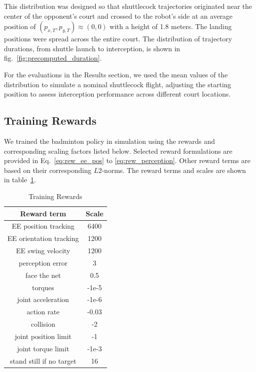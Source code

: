 \documentclass[9pt,twocolumn,twoside]{osajnl}
\begin{document}
This distribution was designed so that shuttlecock trajectories originated near the center of the opponent's court and crossed to the robot's side at an average position of $(p_{x,T}, p_{y,T}) \approx (0, 0)$ with a height of 1.8 meters. The landing positions were spread across the entire court. The distribution of trajectory durations, from shuttle launch to interception, is shown in fig.~\ref{fig:precomputed_duration}.



For the evaluations in the Results section, we used the mean values of the distribution to simulate a nominal shuttlecock flight, adjusting the starting position to assess interception performance across different court locations.


\subsection*{Training Rewards}

We trained the badminton policy in simulation using the rewards and corresponding scaling factors listed below. Selected reward formulations are provided in Eq.~\ref{eq:rew_ee_pos} to \ref{eq:rew_perception}. Other reward terms are based on their corresponding $L2$-norms. The reward terms and scales are shown in table~\ref{tab:rewards}.



\begin{table}
    \centering
    \caption{Training Rewards}
    \begin{tabular}{cc}
    \cellcolor{grey}\textbf{Reward term}              & \cellcolor{grey}\textbf{Scale} \\
    \hline
    EE position tracking     & 6400  \\
    EE orientation tracking  & 1200  \\
    EE swing velocity        & 1200  \\
    perception error         & 3     \\
    face the net             & 0.5   \\
    torques                  & -1e-5 \\
    joint acceleration       & -1e-6 \\
    action rate              & -0.03 \\
    collision                & -2    \\
    joint position limit     & -1    \\
    joint torque limit       & -1e-3 \\
    stand still if no target & 16   
    \end{tabular}
    \label{tab:rewards}
    \end{table}
    
\end{document}
